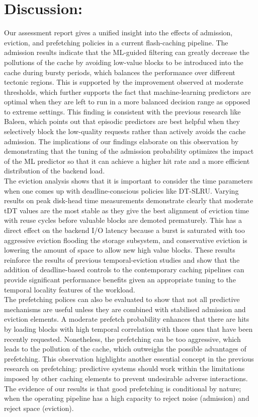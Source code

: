 \documentclass[sigconf]{acmart}
\begin{document}
{\section{Discussion:}
\large Our assessment report gives a unified insight into the effects of admission, eviction, and prefetching policies in a current flash-caching pipeline. The admission results indicate that the ML-guided filtering can greatly decrease the pollutions of the cache by avoiding low-value blocks to be introduced into the cache during bursty periods, which balances the performance over different tectonic regions. This is supported by the improvement observed at moderate thresholds, which further supports the fact that machine-learning predictors are optimal when they are left to run in a more balanced decision range as opposed to extreme settings. This finding is consistent with the previous research like Baleen, which points out that episodic predictors are best helpful when they selectively block the low-quality requests rather than actively avoids the cache admission. The implications of our findings elaborate on this observation by demonstrating that the tuning of the admission probability optimizes the impact of the ML predictor so that it can achieve a higher hit rate and a more efficient distribution of the backend load.\\\indent The eviction analysis shows that it is important to consider the time parameters when one comes up with deadline-conscious policies like DT-SLRU. Varying results on peak disk-head time measurements demonstrate clearly that moderate tDT values are the most stable as they give the best alignment of eviction time with reuse cycles before valuable blocks are demoted prematurely. This has a direct effect on the backend I/O latency because a burst is saturated with too aggressive eviction flooding the storage subsystem, and conservative eviction is lowering the amount of space to allow new high value blocks. These results reinforce the results of previous temporal-eviction studies and show that the addition of deadline-based controls to the contemporary caching pipelines can provide significant performance benefits given an appropriate tuning to the temporal locality features of the workload.\\\indent The prefetching polices can also be evaluated to show that not all predictive mechanisms are useful unless they are combined with stabilised admission and eviction elements. A moderate prefetch probability enhances that there are hits by loading blocks with high temporal correlation with those ones that have been recently requested. Nonetheless, the prefetching can be too aggressive, which leads to the pollution of the cache, which outweighs the possible advantages of prefetching. This observation highlights another essential concept in the previous research on prefetching: predictive systems should work within the limitations imposed by other caching elements to prevent undesirable adverse interactions. The evidence of our results is that good prefetching is conditional by nature; when the operating pipeline has a high capacity to reject noise (admission) and reject space (eviction).\\\indent }
\end{document}
